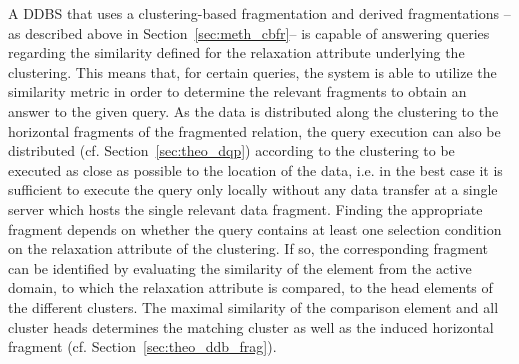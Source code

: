 A DDBS that uses a clustering-based fragmentation and derived fragmentations -- as described above in Section~\ref{sec:meth_cbfr}-- is capable of answering 
queries regarding the similarity defined for the relaxation attribute underlying the clustering. This means that, for certain queries, the system is able to
utilize the similarity metric in order to determine the relevant fragments to obtain an answer to the given query. As the data is distributed along the 
clustering to the horizontal fragments of the fragmented relation, the query execution can also be distributed (cf. Section~\ref{sec:theo_dqp}) according to
the clustering to be executed as close as possible to the location of the data, i.e. in the best case it is sufficient to execute the query only locally 
without any data transfer at a single server which hosts the single relevant data fragment. Finding the appropriate fragment depends on whether the query
contains at least one selection condition on the relaxation attribute of the clustering. If so, the corresponding fragment can be identified by evaluating
the similarity of the element from the active domain, to which the relaxation attribute is compared, to the head elements of the different clusters. The
maximal similarity of the comparison element and all cluster heads determines the matching cluster as well as the induced horizontal fragment 
(cf. Section~\ref{sec:theo_ddb_frag}). 

